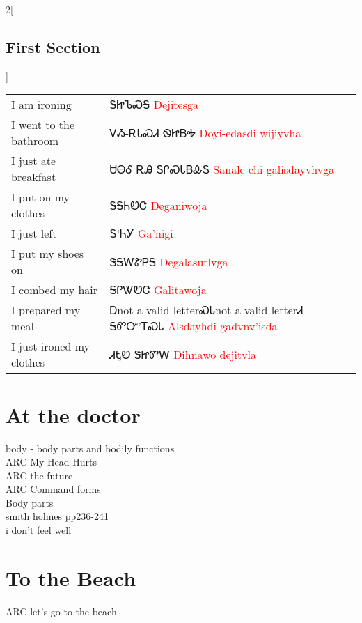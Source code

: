 \begin{multicols}{2}[\section{First Section}]
\begin{minipage}{\linewidth}
\begin{tabular}{p{3cm} p{11cm}}
I am ironing & ᏕᏥᏖᏍᎦ 
 \newline \textcolor{red}{Dejitesga}\\
I went to the bathroom & ᏙᏱ-ᎡᏓᏍᏗ ᏫᏥᏴᎭ 
 \newline \textcolor{red}{Doyi-edasdi wijiyvha}\\
I just ate breakfast & ᏌᎾᎴ-ᎡᎯ ᎦᎵᏍᏓᏴᎲᎦ 
 \newline \textcolor{red}{Sanale-ehi galisdayvhvga}\\
I put on my clothes & ᏕᎦᏂᏬᏣ 
 \newline \textcolor{red}{Deganiwoja}\\

I just left & Ꭶ’ᏂᎩ 
 \newline \textcolor{red}{Ga’nigi}\\
I put my shoes on & ᏕᎦᎳᏑᏢᎦ 
 \newline \textcolor{red}{Degalasutlvga}\\
I combed my hair & ᎦᎵᏔᏬᏣ 
 \newline \textcolor{red}{Galitawoja}\\
I prepared my meal & Ꭰnot a valid letterᏍᏓnot a valid letterᏗ ᎦᏛᏅ’ᎢᏍᏓ 
 \newline \textcolor{red}{Alsdayhdi gadvnv’isda}\\
I just ironed my clothes & ᏗᎿᏬ ᏕᏥᏛᎳ 
 \newline \textcolor{red}{Dihnawo dejitvla}\\
\end{tabular}
\end{minipage}

\end{multicols}

\cite{walcpp828594}
\chapter{At the doctor}
body - body parts and bodily functions\\
ARC My Head Hurts\\
ARC the future\\
ARC Command forms\\
Body parts\\
smith holmes pp236-241\\
i don't feel well\\
\chapter{To the Beach}
ARC let's go to the beach\\
